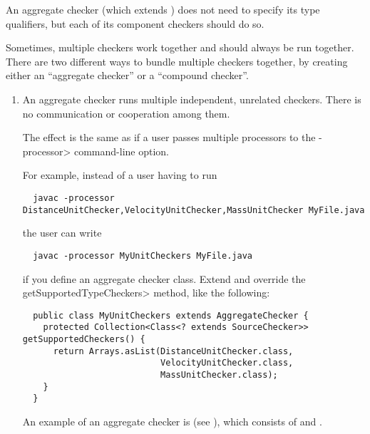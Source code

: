 An aggregate checker (which extends
) does not need to specify its
type qualifiers, but each of its component checkers should do so.



Sometimes, multiple checkers work together and should always be run
together.  There are two different ways to bundle multiple checkers
together, by creating either an ``aggregate checker'' or a ``compound checker''.


\begin{enumerate}
\item
An aggregate checker runs multiple independent, unrelated checkers.  There
is no communication or cooperation among them.

The effect is the same as if a user passes
multiple processors to the \<-processor> command-line option.

For example, instead of a user having to run

\begin{Verbatim}
  javac -processor DistanceUnitChecker,VelocityUnitChecker,MassUnitChecker MyFile.java
\end{Verbatim}

\noindent
the user can write

\begin{Verbatim}
  javac -processor MyUnitCheckers MyFile.java
\end{Verbatim}

\noindent
if you define an aggregate checker class.  Extend  and override
the \<getSupportedTypeCheckers> method, like the following:

\begin{Verbatim}
  public class MyUnitCheckers extends AggregateChecker {
    protected Collection<Class<? extends SourceChecker>> getSupportedCheckers() {
      return Arrays.asList(DistanceUnitChecker.class,
                           VelocityUnitChecker.class,
                           MassUnitChecker.class);
    }
  }
\end{Verbatim}

An example of an aggregate checker is 
(see ), which consists of
 and
.


\end{enumerate}
